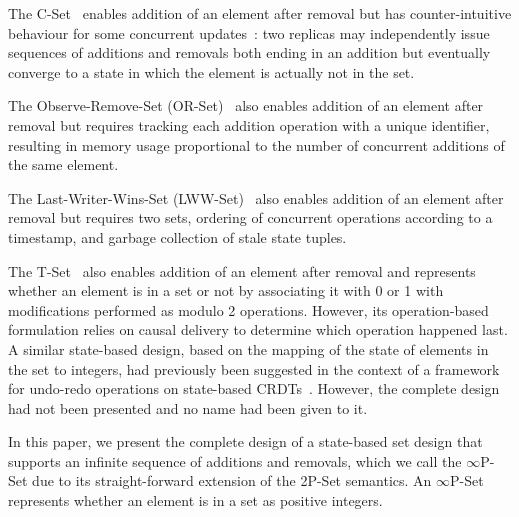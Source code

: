 \documentclass[11pt, oneside]{article}   	%
\begin{document}
The C-Set~\cite{aslan:inria-00594590} enables addition of an element after removal but has counter-intuitive behaviour for some concurrent updates~\cite{bieniusa:hal-00769554}: two replicas may independently issue sequences of additions and removals both ending in an addition but eventually converge to a state in which the element is actually not in the set.

The Observe-Remove-Set (OR-Set)~\cite{shapiro:inria-00555588} also enables addition of an element after removal but requires tracking each addition operation with a unique identifier, resulting in memory usage proportional to the number of concurrent additions of the same element.

The Last-Writer-Wins-Set (LWW-Set)~\cite{shapiro:inria-00555588} also enables addition of an element after removal but requires two sets, ordering of concurrent operations according to a timestamp, and garbage collection of stale state tuples.

The T-Set~\cite{Dolan2020undoable} also enables addition of an element after removal and represents whether an element is in a set or not by associating it with 0 or 1 with modifications performed as modulo 2 operations. However, its operation-based formulation relies on causal delivery to determine which operation happened last. A similar state-based design, based on the mapping of the state of elements in the set to integers, had previously been  suggested in the context of a framework for undo-redo operations on state-based CRDTs~\cite{Yu2019undo}. However, the complete design had not been presented and no name had been given to it.

In this paper, we present the complete design of a state-based set design that supports an infinite sequence of additions and removals, which we call the $\infty$P-Set due to its straight-forward extension of the 2P-Set semantics. An $\infty$P-Set represents whether an element is in a set as positive integers. 
\end{document}
